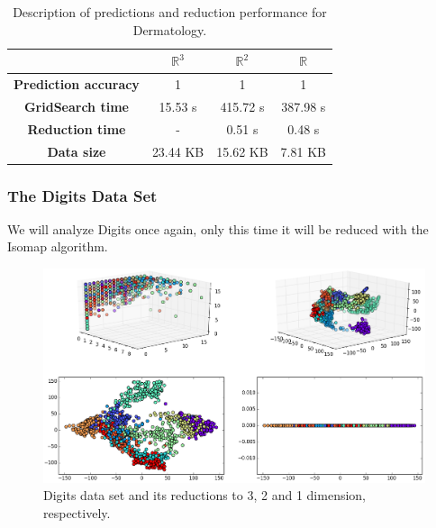 \documentclass[12pt]{article}
\begin{document}
\begin{table}[H]
	\centering
	\begin{tabular}{|c|c|c|c|}
		\hline
		& \textbf{$\mathbb{R}^3$} & \textbf{$\mathbb{R}^2$} & \textbf{$\mathbb{R}$} \\\hline
		\textbf{Prediction accuracy}   & 1            & 1             & 1     \\\hline
		\textbf{GridSearch time} & 15.53 s   & 415.72 s  & 387.98 s  \\\hline
		\textbf{Reduction time}  & -         & 0.51 s       & 0.48 s     \\\hline
		\textbf{Data size}          & 23.44 KB & 15.62 KB  & 7.81 KB   \\\hline
	\end{tabular}
	
	\caption{Description of predictions and reduction performance for Dermatology.}
\end{table}

\newpage
\subsubsection{The Digits Data Set}

We will analyze Digits once again, only this time it will be reduced with the Isomap algorithm.

\begin{figure}[H]
	\centering
	\includegraphics[width=\linewidth]{experiments/2_6_digits_isomap}
	\captionsetup{justification=centering}
	\caption{Digits data set and its reductions to 3, 2 and 1 dimension, respectively.}
	\label{fig:dsdigitsiso}
\end{figure}
\end{document}
